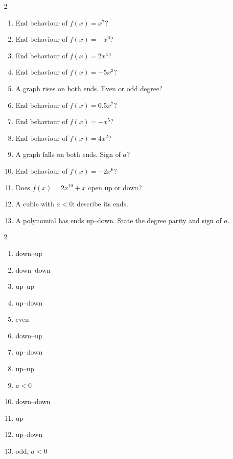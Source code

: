 \documentclass[11pt]{article}
\begin{document}
\begin{recapbox}
\begin{multicols}{2}
\small
\begin{enumerate}[leftmargin=*,itemsep=3pt]
  \item End behaviour of $f(x)=x^7$?
  \item End behaviour of $f(x)=-x^6$?
  \item End behaviour of $f(x)=2x^4$?
  \item End behaviour of $f(x)=-5x^3$?
  \item A graph rises on both ends. Even or odd degree?
  \item End behaviour of $f(x)=0.5x^7$?
  \item End behaviour of $f(x)=-x^5$?
  \item End behaviour of $f(x)=4x^2$?
  \item A graph falls on both ends. Sign of $a$?
  \item End behaviour of $f(x)=-2x^6$?
  \item Does $f(x)=2x^{10}+x$ open up or down?
  \item A cubic with $a<0$: describe its ends.
  \item A polynomial has ends up–down. State the degree parity and sign of $a$.
\end{enumerate}
\end{multicols}
\end{recapbox}

\begin{keybox}
\begin{multicols}{2}
\small
\begin{enumerate}[leftmargin=*,itemsep=3pt]
  \item down–up
  \item down–down
  \item up–up
  \item up–down
  \item even
  \item down–up
  \item up–down
  \item up–up
  \item $a<0$
  \item down–down
  \item up
  \item up–down
  \item odd, $a<0$
\end{enumerate}
\end{multicols}
\end{keybox}
\end{document}
